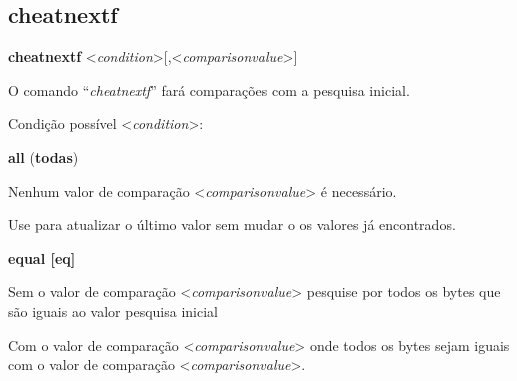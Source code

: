 \documentclass[letterpaper,10pt,brazil]{sphinxmanual}
\begin{document}
\subsection{cheatnextf}
\label{debugger/cheats:cheatnextf}\label{debugger/cheats:debugger-command-cheatnextf}
\begin{DUlineblock}{0em}
\item[]
\begin{DUlineblock}{\DUlineblockindent}
\item[] \textbf{cheatnextf} \textless{}\emph{condition}\textgreater{}{[},\textless{}\emph{comparisonvalue}\textgreater{}{]}
\item[] 
\end{DUlineblock}
\item[] O comando ``\emph{cheatnextf}'' fará comparações com a pesquisa inicial.
\item[] 
\item[] Condição possível \textless{}\emph{condition}\textgreater{}:
\item[] 
\item[]
\begin{DUlineblock}{\DUlineblockindent}
\item[] \textbf{all} (\textbf{todas})
\item[] 
\end{DUlineblock}
\item[] Nenhum valor de comparação \textless{}\emph{comparisonvalue}\textgreater{} é necessário.
\item[] 
\item[] Use para atualizar o último valor sem mudar o os valores já encontrados.
\item[] 
\item[]
\begin{DUlineblock}{\DUlineblockindent}
\item[] \textbf{equal {[}eq{]}}
\item[] 
\end{DUlineblock}
\item[] Sem o valor de comparação \textless{}\emph{comparisonvalue}\textgreater{} pesquise por todos os bytes que são iguais ao valor pesquisa inicial
\item[] Com o valor de comparação \textless{}\emph{comparisonvalue}\textgreater{} onde todos os bytes sejam iguais com o valor de comparação \textless{}\emph{comparisonvalue}\textgreater{}.
\item[] 
\item[]
\begin{DUlineblock}{\DUlineblockindent}

\end{DUlineblock}
\end{DUlineblock}
\end{document}

